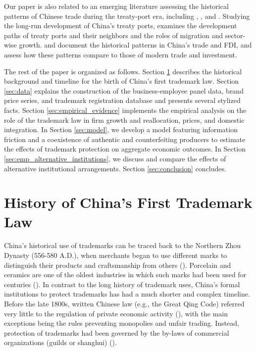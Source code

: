 \documentclass[12pt]{article}
\begin{document}
Our paper is also related to an emerging literature assessing the historical patterns of Chinese trade during the treaty-port era, including \citet{Jia2014}, \citet{KellerLiShiue2013}, and \citet{KellerShiue2020nber}. Studying the long-run development of China's treaty ports, \citet{Jia2014} examines the development paths of treaty ports and their neighbors and the roles of migration and sector-wise growth. \citet{KellerLiShiue2013} and \citet{KellerShiue2020nber} document the historical patterns in China's trade and FDI, and assess how these patterns compare to those of modern trade and investment.


The rest of the paper is organized as follows. Section \ref{sec:historicalbackground} describes the historical background and timeline for the birth of China's first trademark law. Section \ref{sec:data} explains the construction of the business-employee panel data, brand price series, and trademark registration database and presents several stylized facts. Section \ref{sec:empirical_evidence} implements the empirical analysis on the role of the trademark law in firm growth and reallocation, prices, and domestic integration. In Section \ref{sec:model}, we develop a  model featuring information friction and a coexistence of authentic and counterfeiting producers  to estimate the effects of trademark protection on aggregate economic outcomes. In Section \ref{sec:emp_alternative_institutions}, we discuss and compare the effects of alternative institutional arrangements. Section \ref{sec:conclusion} concludes.


\section{History of China's First Trademark Law} \label{sec:historicalbackground}

China's historical use  of trademarks can be traced back to the Northern Zhou Dynasty (556-580 A.D.), when merchants began to use different marks to distinguish their products and craftsmanship from others (\citealp{Chang2014}). Porcelain and ceramics are one of the oldest industries in which such marks had been used for centuries (\citealp{Heuser1975}). In contrast to the long history of trademark uses, China's formal institutions to protect trademarks has had a much shorter and complex timeline. Before the late 1800s, written Chinese law (e.g., the Great Qing Code) referred very little to the regulation of private economic activity (\citealp{Kirby1995}), with the main exceptions being the rules preventing monopolies and unfair trading. Instead, protection of trademarks had been governed by the by-laws of commercial organizations (guilds or shanghui) (\citealp{Alford1995}). 
\end{document}
